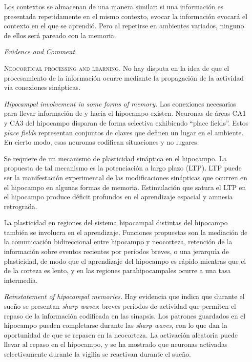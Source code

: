 \documentclass[a4paper,12pt]{article}
\begin{document}
Los contextos se almacenan de una manera similar: si una información es presentada repetidamente en el mismo contexto, evocar la información evocará el contexto en el que se aprendió. Pero al repetirse en ambientes variados, ninguno de ellos será pareado con la memoria.

{\itshape Evidence and Comment}

{\scshape Neocortical processing and learning.} No hay disputa en la idea de que el procesamiento de la información ocurre mediante la propagación de la actividad vía conexiones sinápticas. 

{\itshape Hipocampal involvement in some forms of memory.} Las conexiones necesarias para llevar información de y hacia el hipocampo existen. Neuronas de áreas CA1 y CA3 del hipocampo disparan de forma selectiva exhibiendo ``place fields''. Estos {\itshape place fields} representan conjuntos de claves que definen un lugar en el ambiente. En cierto modo, esas neuronas codifican situaciones y no lugares.

Se requiere de un mecanismo de plasticidad sináptica en el hipocampo. La propuesta de tal mecanismo es la potenciación a largo plazo (LTP). LTP puede ser la manifestación experimental de las modificaciones sinápticas que ocurren en el hipocampo en algunas formas de memoria. Estimulación que satura el LTP en el hipocampo produce déficit profundos en el aprendizaje espacial y amnesia retrograda. 

La plasticidad en regiones del sistema hipocampal distintas del  hipocampo también se involucra en el aprendizaje. Funciones propuestas son la mediación de la comunicación bidireccional entre hipocampo y neocorteza, retención de la información sobre eventos recientes por períodos breves, o una jerarquía de plasticidad, de modo que el aprendizaje del hipocampo es rápido mientras que el de la corteza es lento, y en las regiones parahipocampales ocurre a una tasa intermedia.

{\itshape Reinstatement of hipocampal memories.} Hay evidencia que indica que durante el sueño se presentan {\itshape sharp waves}: breves periodos de actividad que permiten el repaso de la información codificada en las sinapsis. Los patrones guardados en el hipocampo pueden completarse durante las {\itshape sharp waves}, con lo que dan la oportunidad de que se repasen en la neocorteza. La activación aleatoria puede llevar al repaso en el hipocampo, y se ha mostrado que neuronas activadas selectivamente durante la vigilia se reactivan durante el sueño.
\end{document}
